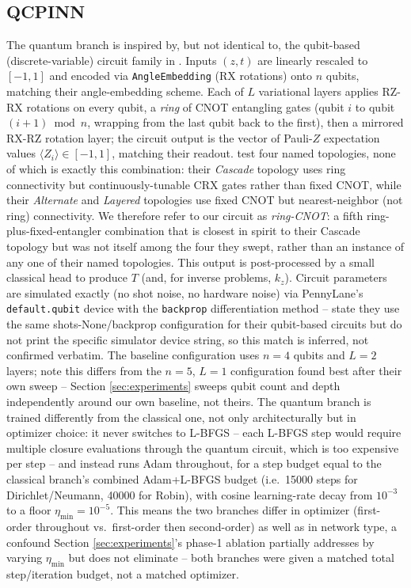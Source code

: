 \subsection{QCPINN}
The quantum branch is inspired by, but not identical to, the qubit-based
(discrete-variable) circuit family in \citet{farea2025qcpinn}. Inputs
$(z,t)$ are linearly rescaled to $[-1,1]$ and encoded via
\texttt{AngleEmbedding} (RX rotations) onto $n$ qubits, matching their
angle-embedding scheme. Each of $L$ variational layers applies RZ-RX
rotations on every qubit, a \emph{ring} of CNOT entangling gates (qubit $i$
to qubit $(i+1) \bmod n$, wrapping from the last qubit back to the first),
then a mirrored RX-RZ rotation layer; the circuit output is the vector of
Pauli-$Z$ expectation values $\langle Z_i\rangle \in [-1,1]$, matching
their readout. \citet{farea2025qcpinn} test four named topologies, none of
which is exactly this combination: their \emph{Cascade} topology uses ring
connectivity but continuously-tunable CRX gates rather than fixed CNOT,
while their \emph{Alternate} and \emph{Layered} topologies use fixed CNOT
but nearest-neighbor (not ring) connectivity. We therefore refer to our
circuit as \emph{ring-CNOT}: a fifth ring-plus-fixed-entangler combination
that is closest in spirit to their Cascade topology but was not itself
among the four they swept, rather than an instance of any one of their
named topologies. This output is post-processed by a small
classical head to produce $T$ (and, for inverse problems, $k_z$). Circuit
parameters are simulated exactly (no shot noise, no hardware noise) via
PennyLane's \texttt{default.qubit} device with the \texttt{backprop}
differentiation method -- \citet{farea2025qcpinn} state they use the same
shots-None/backprop configuration for their qubit-based circuits but do not
print the specific simulator device string, so this match is inferred, not
confirmed verbatim. The baseline configuration uses $n=4$ qubits and $L=2$
layers; note this differs from the $n=5$, $L=1$ configuration
\citet{farea2025qcpinn} found best after their own sweep -- Section
\ref{sec:experiments} sweeps qubit count and depth independently around our
own baseline, not theirs. The quantum branch is trained differently from
the classical one, not only architecturally but in optimizer choice: it
never switches to L-BFGS -- each L-BFGS step would require multiple
closure evaluations through the quantum circuit, which is too expensive
per step -- and instead runs Adam throughout, for a step budget equal to
the classical branch's combined Adam+L-BFGS budget (i.e.\ 15000 steps for
Dirichlet/Neumann, 40000 for Robin), with cosine learning-rate decay from
$10^{-3}$ to a floor $\eta_{\min}=10^{-5}$. This means the two branches
differ in optimizer (first-order throughout vs.\ first-order then
second-order) as well as in network type, a confound Section
\ref{sec:experiments}'s phase-1 ablation partially addresses by varying
$\eta_{\min}$ but does not eliminate -- both branches were given a matched
total step/iteration budget, not a matched optimizer.

